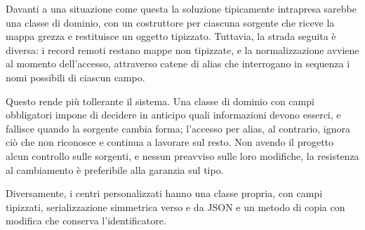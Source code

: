 Davanti a una situazione come questa la soluzione tipicamente intrapresa sarebbe una classe di dominio, con un costruttore per
ciascuna sorgente che riceve la mappa grezza e restituisce un oggetto tipizzato.
Tuttavia, la strada seguita è diversa: i record remoti restano mappe non tipizzate,
e la normalizzazione avviene al momento dell'accesso, attraverso catene di alias che interrogano in sequenza i nomi possibili
di ciascun campo.

Questo rende più tollerante il sistema.
Una classe di dominio con campi obbligatori impone di decidere in anticipo quali informazioni devono esserci, e fallisce
quando la sorgente cambia forma; l'accesso per alias, al contrario, ignora ciò che non riconosce e continua a lavorare sul resto.
Non avendo il progetto alcun controllo sulle sorgenti, e nessun preavviso sulle loro modifiche, la resistenza al cambiamento
è preferibile alla garanzia sul tipo.


Diversamente, i centri personalizzati hanno una classe propria, con campi tipizzati, serializzazione simmetrica verso e da JSON e un
metodo di copia con modifica che conserva l'identificatore.

